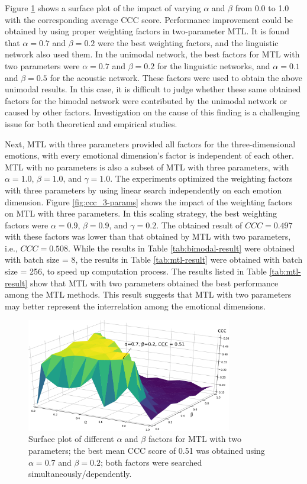 Figure \ref{fig:ccc_2-params} shows a surface plot of the impact of varying
$\alpha$ and $\beta$ from 0.0 to 1.0 with the corresponding average CCC score.
Performance improvement could be obtained by using proper weighting factors in
two-parameter MTL. It is found that $\alpha=0.7$ and $\beta=0.2$ were the best
weighting factors, and the linguistic network also used them.  In the unimodal
network, the best factors for MTL with two parameters were $\alpha=0.7$ and
$\beta=0.2$ for the linguistic networks, and $\alpha=0.1$ and $\beta=0.5$ for
the acoustic network. These factors were used to obtain the above unimodal results. In this case, it is difficult to judge whether these same obtained
factors for the bimodal network were contributed by the unimodal network or
caused by other factors.  Investigation on the cause of this finding is a
challenging issue for both theoretical and empirical studies.

Next, MTL with three parameters provided all factors for the three-dimensional
emotions, with every emotional dimension's factor is independent of each
other.  MTL with no parameters is also a subset of MTL with three parameters,
with $\alpha=1.0$, $\beta=1.0$, and $\gamma=1.0$. The experiments optimized the
weighting factors with three parameters by using linear search independently on
each emotion dimension. Figure \ref{fig:ccc_3-params} shows the impact of the
weighting factors on MTL with three parameters. In this scaling strategy, the
best weighting factors were $\alpha=0.9$, $\beta=0.9$, and $\gamma=0.2$. The
obtained result of $CCC=0.497$ with these factors was lower than that obtained
by MTL with two parameters, i.e., $CCC=0.508$. While the results in Table
\ref{tab:bimodal-result} were obtained with batch size = 8, the results in
Table \ref{tab:mtl-result} were obtained with batch size = 256, to speed up
computation process. The results listed in Table \ref{tab:mtl-result} show that
MTL with two parameters obtained the best performance among the MTL methods.
This result suggests that MTL with two parameters may better represent the
interrelation among the emotional dimensions. 

\begin{figure}[htpb]
  \begin{center}
  \includegraphics[width=0.8\textwidth]{../fig/alpha_beta.pdf}
  \end{center}
  \caption{Surface plot of different $\alpha$ and $\beta$ factors for MTL with two parameters; the best mean CCC score of 0.51 was obtained using $\alpha=0.7$ and $\beta=0.2$; both factors were searched simultaneously/dependently.}
  \label{fig:ccc_2-params}
\end{figure}

